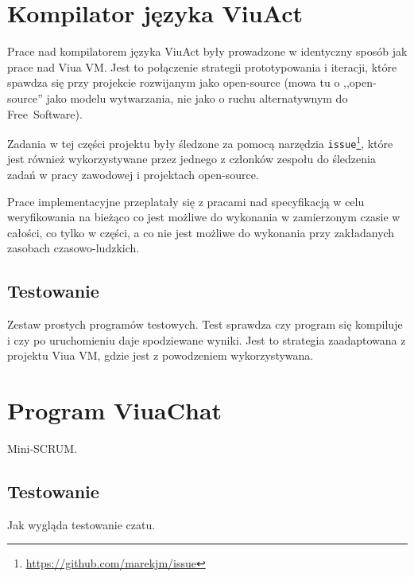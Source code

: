 \section{Kompilator języka ViuAct}

Prace nad kompilatorem języka ViuAct były prowadzone w identyczny sposób jak prace nad Viua VM.
Jest to połączenie strategii prototypowania i iteracji, które spawdza się przy projekcie rozwijanym jako
open-source (mowa tu o ,,open-source'' jako modelu wytwarzania, nie jako o ruchu alternatywnym do
Free~Software).

Zadania w tej części projektu były śledzone za pomocą narzędzia
\texttt{issue}\footnote{\url{https://github.com/marekjm/issue}}, które jest również wykorzystywane przez
jednego z członków zespołu do śledzenia zadań w pracy zawodowej i projektach open-source.

Prace implementacyjne przeplatały się z pracami nad specyfikacją w celu weryfikowania na bieżąco co jest
możliwe do wykonania w zamierzonym czasie w całości, co tylko w części, a co nie jest możliwe do wykonania
przy zakładanych zasobach czasowo-ludzkich.

\subsection{Testowanie}

Zestaw prostych programów testowych. Test sprawdza czy program się kompiluje i czy po uruchomieniu daje
spodziewane wyniki. Jest to strategia zaadaptowana z projektu Viua VM, gdzie jest z powodzeniem
wykorzystywana.

\section{Program ViuaChat}

Mini-SCRUM.

\subsection{Testowanie}

Jak wygląda testowanie czatu.
